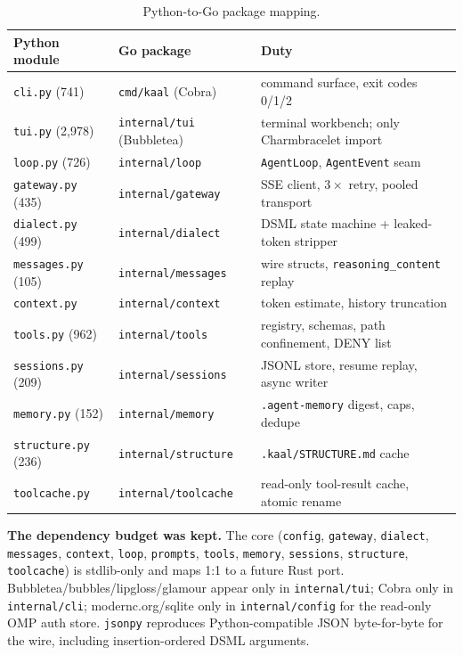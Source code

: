 \documentclass[11pt,a4paper]{article}
\newcommand{\go}[1]{\textcolor{gogreen}{\texttt{#1}}}
\begin{document}
\begin{table}[ht]
\centering
\small
\begin{tabularx}{\textwidth}{@{}l l Y@{}}
\toprule
\textbf{Python module} & \textbf{Go package} & \textbf{Duty} \\
\midrule
\texttt{cli.py} (741) & \go{cmd/kaal} (Cobra) & command surface, exit codes 0/1/2 \\
\texttt{tui.py} (2,978) & \go{internal/tui} (Bubbletea) & terminal workbench; only Charmbracelet import \\
\texttt{loop.py} (726) & \go{internal/loop} & \texttt{AgentLoop}, \texttt{AgentEvent} seam \\
\texttt{gateway.py} (435) & \go{internal/gateway} & SSE client, $3\times$ retry, pooled transport \\
\texttt{dialect.py} (499) & \go{internal/dialect} & DSML state machine + leaked-token stripper \\
\texttt{messages.py} (105) & \go{internal/messages} & wire structs, \texttt{reasoning\_content} replay \\
\texttt{context.py} & \go{internal/context} & token estimate, history truncation \\
\texttt{tools.py} (962) & \go{internal/tools} & registry, schemas, path confinement, DENY list \\
\texttt{sessions.py} (209) & \go{internal/sessions} & JSONL store, resume replay, async writer \\
\texttt{memory.py} (152) & \go{internal/memory} & \texttt{.agent-memory} digest, caps, dedupe \\
\texttt{structure.py} (236) & \go{internal/structure} & \texttt{.kaal/STRUCTURE.md} cache \\
\texttt{toolcache.py} & \go{internal/toolcache} & read-only tool-result cache, atomic rename \\
\bottomrule
\end{tabularx}
\caption{Python-to-Go package mapping.}
\label{tab:module-map}
\end{table}

\noindent
\textbf{The dependency budget was kept.} The core (\texttt{config}, \texttt{gateway}, \texttt{dialect}, \texttt{messages}, \texttt{context}, \texttt{loop}, \texttt{prompts}, \texttt{tools}, \texttt{memory}, \texttt{sessions}, \texttt{structure}, \texttt{toolcache}) is stdlib-only and maps 1:1 to a future Rust port. Bubbletea/bubbles/lipgloss/glamour appear only in \texttt{internal/tui}; Cobra only in \texttt{internal/cli}; modernc.org/sqlite only in \texttt{internal/config} for the read-only OMP auth store. \texttt{jsonpy} reproduces Python-compatible JSON byte-for-byte for the wire, including insertion-ordered DSML arguments.
\end{document}

